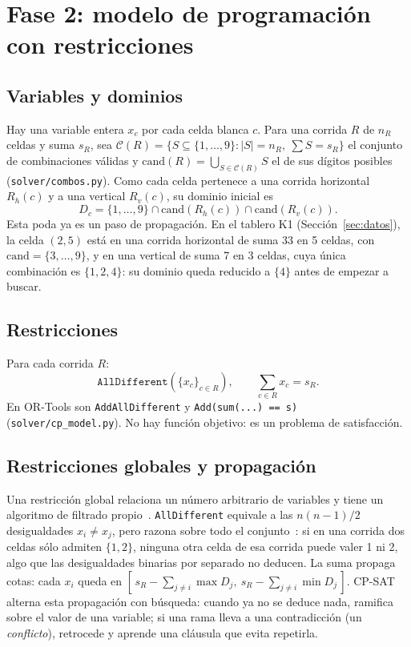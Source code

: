 \documentclass[conference,a4paper]{IEEEtran}
\begin{document}
\section{Fase 2: modelo de programación con restricciones}\label{sec:cp}

\subsection{Variables y dominios}
Hay una variable entera $x_c$ por cada celda blanca $c$. Para una corrida $R$ de $n_R$ celdas y suma $s_R$, sea
$\mathcal{C}(R)=\{S\subseteq\{1,\dots,9\} : |S|=n_R,\ \sum S=s_R\}$ el conjunto de combinaciones válidas y
$\text{cand}(R)=\bigcup_{S\in\mathcal{C}(R)} S$ el de sus dígitos posibles (\texttt{solver/combos.py}). Como cada celda pertenece a una
corrida horizontal $R_h(c)$ y a una vertical $R_v(c)$, su dominio inicial es
\begin{equation}
D_c = \{1,\dots,9\} \cap \text{cand}(R_h(c)) \cap \text{cand}(R_v(c)).
\end{equation}
Esta poda ya es un paso de propagación. En el tablero K1 (Sección~\ref{sec:datos}), la celda $(2,5)$ está en una corrida horizontal
de suma 33 en 5 celdas, con $\text{cand}=\{3,\dots,9\}$, y en una vertical de suma 7 en 3 celdas, cuya única combinación es $\{1,2,4\}$:
su dominio queda reducido a $\{4\}$ antes de empezar a buscar.

\subsection{Restricciones}
Para cada corrida $R$:
\begin{equation}
\texttt{AllDifferent}(\{x_c\}_{c\in R}), \qquad \sum_{c\in R} x_c = s_R .
\end{equation}
En OR-Tools son \texttt{AddAllDifferent} y \texttt{Add(sum(...) == s)} (\texttt{solver/cp\_model.py}). No hay función objetivo:
es un problema de satisfacción.

\subsection{Restricciones globales y propagación}
Una restricción global relaciona un número arbitrario de variables y tiene un algoritmo de filtrado propio~\cite{rossi}.
\texttt{AllDifferent} equivale a las $n(n-1)/2$ desigualdades $x_i\neq x_j$, pero razona sobre todo el conjunto~\cite{regin}:
si en una corrida dos celdas sólo admiten $\{1,2\}$, ninguna otra celda de esa corrida puede valer 1 ni 2, algo que las desigualdades
binarias por separado no deducen. La suma propaga cotas: cada $x_i$ queda en
$[\,s_R-\sum_{j\neq i}\max D_j,\ s_R-\sum_{j\neq i}\min D_j\,]$. CP-SAT~\cite{ortools} alterna esta propagación con búsqueda:
cuando ya no se deduce nada, ramifica sobre el valor de una variable; si una rama lleva a una contradicción (un \emph{conflicto}),
retrocede y aprende una cláusula que evita repetirla.
\end{document}
